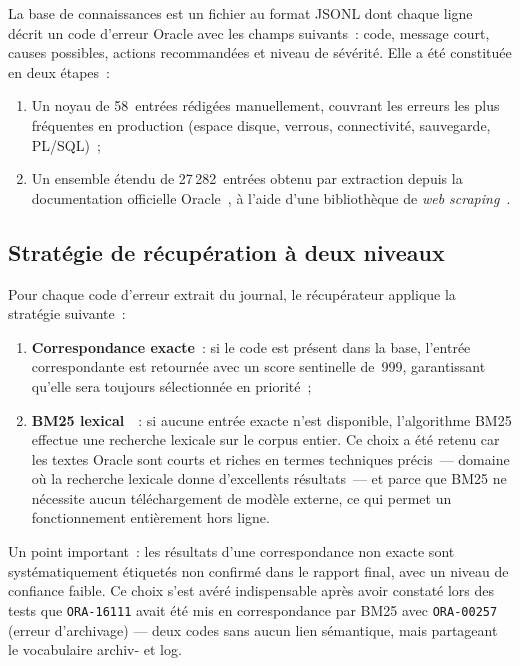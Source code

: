 \documentclass[12pt,a4paper]{report}
\begin{document}
La base de connaissances est un fichier au format JSONL dont chaque ligne d\'ecrit un
code d'erreur Oracle avec les champs suivants~: code, message court, causes possibles,
actions recommand\'ees et niveau de s\'ev\'erit\'e. Elle a \'et\'e constitu\'ee en deux
\'etapes~:

\begin{enumerate}[leftmargin=*]
  \item Un noyau de 58~entr\'ees r\'edig\'ees manuellement, couvrant les erreurs les plus
        fr\'equentes en production (espace disque, verrous, connectivit\'e, sauvegarde,
        PL/SQL)~;
  \item Un ensemble \'etendu de 27\,282~entr\'ees obtenu par extraction depuis la
        documentation officielle Oracle~\cite{oracledoc}, \`a l'aide d'une biblioth\`eque
        de \emph{web scraping}~\cite{bs4}.
\end{enumerate}

\subsection{Strat\'egie de r\'ecup\'eration \`a deux niveaux}

Pour chaque code d'erreur extrait du journal, le r\'ecup\'erateur applique la strat\'egie
suivante~:

\begin{enumerate}[leftmargin=*]
  \item \textbf{Correspondance exacte}~: si le code est pr\'esent dans la base,
        l'entr\'ee correspondante est retourn\'ee avec un score sentinelle de~999,
        garantissant qu'elle sera toujours s\'electionn\'ee en priorit\'e~;
  \item \textbf{BM25 lexical}~\cite{bm25}~: si aucune entr\'ee exacte n'est disponible,
        l'algorithme BM25 effectue une recherche lexicale sur le corpus entier. Ce choix
        a \'et\'e retenu car les textes Oracle sont courts et riches en termes techniques
        pr\'ecis~--- domaine o\`u la recherche lexicale donne d'excellents r\'esultats~---
        et parce que BM25 ne n\'ecessite aucun t\'el\'echargement de mod\`ele externe,
        ce qui permet un fonctionnement enti\`erement hors ligne.
\end{enumerate}

Un point important~: les r\'esultats d'une correspondance non exacte sont
syst\'ematiquement \'etiquet\'es \og{}non confirm\'e\fg{} dans le rapport final,
avec un niveau de confiance faible. Ce choix s'est av\'er\'e indispensable apr\`es avoir
constat\'e lors des tests que \texttt{ORA-16111} avait \'et\'e mis en correspondance par
BM25 avec \texttt{ORA-00257} (erreur d'archivage) --- deux codes sans aucun lien
s\'emantique, mais partageant le vocabulaire \og{}archiv-\fg{} et \og{}log\fg{}.
\end{document}
